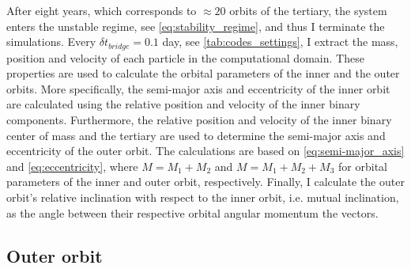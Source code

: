 After eight years, which corresponds to $\approx 20$ orbits of the tertiary, the system enters the unstable regime, see \cref{eq:stability_regime}, and thus I terminate the simulations. Every $\delta t_{bridge}=0.1$ day, see \cref{tab:codes_settings}, I extract the mass, position and velocity of each particle in the computational domain. These properties are used to calculate the orbital parameters of the inner and the outer orbits. More specifically, the semi-major axis and eccentricity of the inner orbit are calculated using the relative position and velocity of the inner binary components. Furthermore, the relative position and velocity of the inner binary center of mass and the tertiary are used to determine the semi-major axis and eccentricity of the outer orbit. The calculations are based on \cref{eq:semi-major_axis} and \cref{eq:eccentricity}, where $M = M_1 + M_2$ and $M = M_1 + M_2 + M_3$ for orbital parameters of the inner and outer orbit, respectively. Finally, I calculate the outer orbit's relative inclination with respect to the inner orbit, i.e. mutual inclination, as the angle between their respective orbital angular momentum the vectors.

\subsection{Outer orbit}

